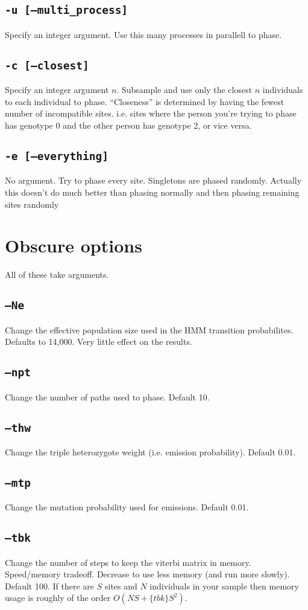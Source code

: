 \documentclass[10pt]{refart}
\begin{document}
\subsection{\texttt{-u [--multi\_process]}}
Specify an integer argument. Use this many processes in parallell to phase. 

\subsection{\texttt{-c [--closest]}}
Specify an integer argument $n$. Subsample and use only the closest $n$ individuals to each individual to phase. ``Closeness'' is determined by having the fewest number of incompatible sites. i.e. sites where the person you're trying to phase has genotype 0 and the other person has genotype 2, or vice versa. 

\subsection{\texttt{-e [--everything]}}
No argument. Try to phase every site. Singletons are phased randomly. Actually this doesn't do much better than phasing normally and then phasing remaining sites randomly

\newpage

\section{Obscure options}
All of these take arguments. 
\subsection{\texttt{--Ne}}
Change the effective population size used in the HMM transition probabilites. Defaults to 14,000. Very little effect on the results.

\subsection{\texttt{--npt}}
Change the number of paths used to phase. Default 10.

\subsection{\texttt{--thw}}
Change the triple heterozygote weight (i.e. emission probability). Default 0.01.

\subsection{\texttt{--mtp}}
Change the mutation probability used for emissions. Default 0.01.

\subsection{\texttt{--tbk}}
Change the number of steps to keep the viterbi matrix in
memory. Speed/memory tradeoff. Decrease to use less memory (and run
more slowly). Default 100. If there are $S$ sites and $N$ individuals
in your sample then memory usage is roughly of the order
$O(NS+\{tbk\}S^2)$. 
\end{document}
